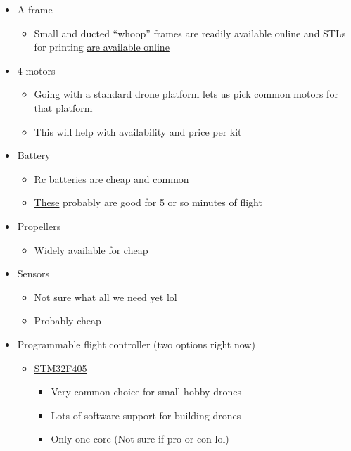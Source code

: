 \documentclass[12pt, titlepage]{article}
\begin{document}
\begin{itemize}
\item A frame
	\begin{itemize}
	\item Small and ducted “whoop” frames are readily available online and STLs for printing \href{https://www.printables.com/model/538153-basher-tiny-whoop-frame}{are available online}
	\end{itemize}
\item 4 motors
	\begin{itemize}
	\item Going with a standard drone platform lets us pick \href{https://microdcmotors.com/product/7mm-coreless-dc-motor-16mm-type-model-nfp-d0716}{common motors} for that platform
	\item This will help with availability and price per kit
	\end{itemize}
\item Battery
	\begin{itemize}
	\item Rc batteries are cheap and common
	\item \href{https://www.towerhobbies.com/product/3.7v-1s-400mah-lipo-battery-molex-51005/HBZ-1266.html}{These} probably are good for 5 or so minutes of flight
	\end{itemize}		
\item Propellers
	\begin{itemize}
	\item \href{https://newbeedrone.com/products/hqprop-35mmx3-tri-blade-35mm-micro-whoop-prop-1mm-shaft-4-pack}{Widely available for cheap}
	\end{itemize}
\item Sensors
	\begin{itemize}
	\item Not sure what all we need yet lol
	\item Probably cheap
	\end{itemize}
\item Programmable flight controller (two options right now)
	\begin{itemize}
	\item \href{https://docs.zephyrproject.org/latest/boards/weact/stm32f405_core/doc/index.html}{STM32F405}
		\begin{itemize}
		\item Very common choice for small hobby drones
		\item Lots of software support for building drones
		\item Only one core (Not sure if pro or con lol)

\end{itemize}
\end{itemize}
\end{itemize}
\end{document}
